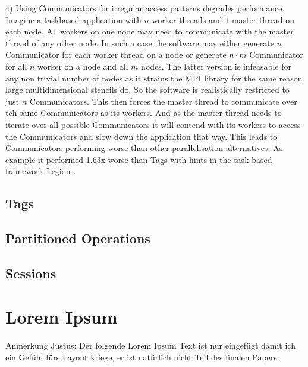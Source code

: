 \documentclass[sigconf]{acmart}
\begin{document}
4) Using Communicators for irregular access patterns degrades performance.
Imagine a taskbased application with $n$ worker threads and $1$ master thread on each node.
All workers on one node may need to communicate with the master thread of any other node.
In such a case the software may either generate $n$ Communicator for each worker thread on a node or generate $n \cdot m$ Communicator for all $n$ worker on a node and all $m$ nodes.
The latter version is infeasable for any non trivial number of nodes as it strains the MPI library for the same reason large multidimensional stencils do.
So the software is realistically restricted to just $n$ Communicators.
This then forces the master thread to communicate over teh same Communicators as its workers.
And as the master thread needs to iterate over all possible Communicators it will contend with its workers to access the Communicators and slow down the application that way.
This leads to Communicators performing worse than other parallelisation alternatives.
As example it performed 1.63x worse than Tags with hints in the task-based framework Legion \cite{zambreLogicalParallel2021}.

\subsection{Tags}
\subsection{Partitioned Operations}
\subsection{Sessions} %

\section{Lorem Ipsum}

Anmerkung Justus: Der folgende Lorem Ipsum Text ist nur eingefügt damit ich ein Gefühl fürs Layout kriege, er ist natürlich nicht Teil des finalen Papers.
\end{document}

